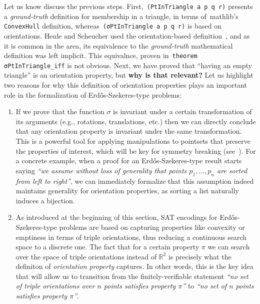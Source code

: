 Let us know discuss the previous steps. First,~\lstinline|(PtInTriangle a p q r)| presents a \emph{ground-truth}  definition for membership in a triangle, in terms of~\textsf{mathlib}'s \lstinline|ConvexHull| definition,  whereas~\lstinline|(σPtInTriangle a p q r)| is based on orientations. Heule and Scheucher used the orientation-based definition~\cite{emptyHexagonNumber}, and as it is common in the area, its equivalence to the \emph{ground-truth} mathematical definition was left implicit. This equivalnce, proven in~\lstinline|theorem σPtInTriangle_iff| is not obvious. Next, we have proved that ``having an empty triangle'' is an orientation property, but \textbf{why is that relevant?} Let us highlight two reasons for why this definition of orientation properties plays an important role in the formalization of Erd\H{o}s-Szekeres-type problems:
\begin{enumerate}
  \item If we prove that the function $\sigma$ is invariant under a certain transformation of its arguments (e.g., rotations, translations, etc.) then we can directly conclude that any orientation property is invariant under the same transformation. This is a powerful tool for applying manipulations to pointsets that preserve the properties of interest, which will be key for symmetry breaking (see~). For a concrete example, when a proof for an Erd\H{o}s-Szekeres-type result starts saying \emph{``we assume without loss of generality that points $p_1, \ldots, p_n$ are sorted from left to right''}, we can immediately formalize that this assumption indeed maintains generality for orientation properties, as sorting a list naturally induces a bijection.
  \item As introduced at the beginning of this section, SAT encodings for Erd\H{o}s-Szekeres-type problems are based on capturing properties like convexity or emptiness in terms of triple orientations, thus reducing a continuous search space to a discrete one. The fact that for a certain property $\pi$ we can search over the space of triple orientations instead of $\mathbb{R}^2$ is precisely what the definiton of \emph{orientation property} captures. In other words, this is the key idea that will allow us to transition from the finitely-verifiable statement \emph{``no set of triple orientations over $n$ points satisfies property $\pi$''} to \emph{``no set of $n$ points satisfies property $\pi$''}.
\end{enumerate}



